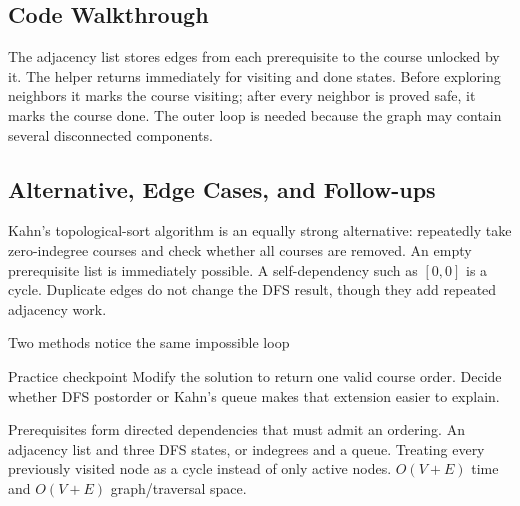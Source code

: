 \subsection{Code Walkthrough}
The adjacency list stores edges from each prerequisite to the course unlocked
by it. The helper returns immediately for visiting and done states. Before
exploring neighbors it marks the course visiting; after every neighbor is
proved safe, it marks the course done. The outer loop is needed because
the graph may contain several disconnected components.

\subsection{Alternative, Edge Cases, and Follow-ups}
Kahn's topological-sort algorithm is an equally strong alternative: repeatedly
take zero-indegree courses and check whether all courses are removed. An empty
prerequisite list is immediately possible. A self-dependency such as
\([0,0]\) is a cycle. Duplicate edges do not change the DFS result, though
they add repeated adjacency work.

\begin{visualbox}{Two methods notice the same impossible loop}
\centering
{}
\end{visualbox}

\begin{revisionbox}{Practice checkpoint}
Modify the solution to return one valid course order. Decide whether DFS
postorder or Kahn's queue makes that extension easier to explain.
\end{revisionbox}
\chaptercheckpoint
  {Prerequisites form directed dependencies that must admit an ordering.}
  {An adjacency list and three DFS states, or indegrees and a queue.}
  {Treating every previously visited node as a cycle instead of only active nodes.}
  {$O(V+E)$ time and $O(V+E)$ graph/traversal space.}
\judgeclassnote


